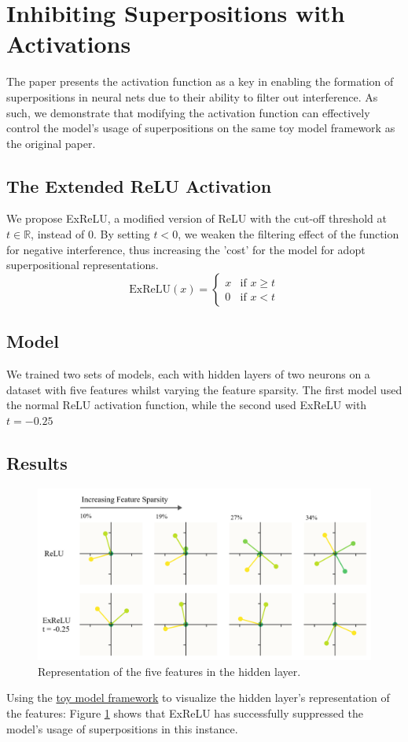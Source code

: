 \section{Inhibiting Superpositions with Activations}
\label{sec:act_fns}
The paper presents the activation function as a key in enabling the formation of superpositions in neural nets due to their ability to filter out interference. As such, we demonstrate that modifying the activation function can effectively control the model's usage of superpositions on the same toy model framework as the original paper. 

\subsection{The Extended ReLU Activation}
We propose ExReLU, a modified version of ReLU with the cut-off threshold at $t \in \mathbb{R}$, instead of $0$. By setting $t < 0$, we weaken the filtering effect of the function for negative interference, thus
increasing the 'cost' for the model for adopt superpositional representations.
\[
\text{ExReLU}(x) =
    \begin{cases}
        x & \text{if } x \geq t\\
        0 & \text{if } x < t
    \end{cases}
\] 

\subsection{Model}
We trained two sets of models, each with hidden layers of two neurons on a dataset with five features whilst varying the feature
sparsity. The first model used the normal ReLU activation function, while the second used ExReLU with $t=-0.25$

\subsection{Results}
\begin{figure}[h]
	\centering
	\includegraphics[width=1\linewidth]{figures/acts_diagram.png}
	\caption{Representation of the five features in the hidden layer.}
	\label{fig:acts_diagram}
\end{figure}
Using the \href{https://colab.research.google.com/github/anthropics/toy-models-of-superposition/blob/main/toy_models.ipynb}{toy model framework} to visualize the hidden layer's representation of the features:
Figure \ref{fig:acts_diagram} shows that ExReLU has successfully suppressed the model's usage of superpositions in this instance.
